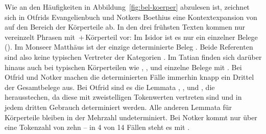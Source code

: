 Wie an den Häufigkeiten in Abbildung~\ref{fig:bel-koerper} abzulesen ist, zeichnet sich in Otfrids Evangelienbuch und Notkers Boethius eine  Kontextexpansion  von  auf den Bereich der Körperteile ab. 
In den drei frühsten Texten kommen nur vereinzelt Phrasen mit \,+\,Körperteil vor: Im Isidor ist es nur ein einzelner Belege (). Im Monseer Matthäus ist der einzige determinierte Beleg . Beide Referenten sind also keine typischen Vertreter der Kategorien . Im Tatian finden sich darüber hinaus auch bei typischen Körperteilen wie , ,   und  einzelne Belege mit . Bei Otfrid und Notker machen die determinierten Fälle immerhin knapp ein Drittel der Gesamtbelege aus. Bei Otfrid sind es die Lemmata  ,  ,   und , die herausstechen, da diese mit zweistelligen Tokenwerten vertreten sind und in jedem dritten Gebrauch determiniert werden. Alle anderen Lemmata  für Körperteile bleiben in der Mehrzahl undeterminiert. Bei Notker kommt nur  über eine Tokenzahl von zehn -- in 4 von 14 Fällen steht es mit .

